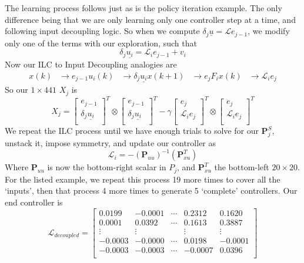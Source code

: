 The learning process follows just as is the policy iteration example. The only difference being that we are only learning only one controller step at a time, and following input decoupling logic. So when we compute $\delta_j\underline{u}=\mathcal{L}e_{j-1}$, we modify only one of the terms with our exploration, such that
\begin{equation}
    \delta_j\underline{u_i}=\mathcal{L}_i e_{j-1}+v_i
\end{equation}
Now our ILC to Input Decoupling analogies are
\begin{align}
    x\left(k\right)&\rightarrow e_{j-1}
    u_i\left(k\right)&\rightarrow\delta_j\underline{u_i}
    x\left(k+1\right)&\rightarrow e_j
    F_i x\left(k\right)&\rightarrow\mathcal{L}_i e_j
\end{align}
So our $1 \times441$ $X_j$ is 
\begin{equation}
    X_j={\left[\begin{matrix}e_{j-1}\\\delta_j\underline{u_i}\\\end{matrix}\right]}^T\otimes{\left[\begin{matrix}e_{j-1}\\\delta_j\underline{u_i}\\\end{matrix}\right]}^T-{\gamma\left[\begin{matrix}e_j\\\mathcal{L}_i e_j\\\end{matrix}\right]}^T\otimes{\left[\begin{matrix}e_j\\\mathcal{L}_i e_j\\\end{matrix}\right]}^T
\end{equation}
We repeat the ILC process until we have enough trials to solve for our $\textbf{P}_j^S$, unstack it, impose symmetry, and update our controller as
\begin{equation}
    \mathcal{L}_i=-{\left(\textbf{P}_{uu}\right)}^{-1}\left(\textbf{P}_{xu}^T\right)
\end{equation}
Where $\textbf{P}_{uu}$ is now the bottom-right scalar in $P_j$, and $\textbf{P}_{xu}^T$ the bottom-left $20\times20$. For the listed example, we repeat this process 19 more times to cover all the `inputs', then that process 4 more times to generate 5 `complete' controllers. Our end controller is
\begin{equation}
    \mathcal{L}_{decoupled}=\left[\begin{matrix}0.0199&-0.0001&\cdots&0.2312&0.1620\\0.0001&0.0392&\cdots&0.1613&0.3887\\\vdots&\vdots&&\vdots&\vdots\\-0.0003&-0.0000&\cdots&0.0198&-0.0001\\-0.0003&-0.0003&\cdots&-0.0007&0.0396\\\end{matrix}\right]
    \label{eq:decoupled_ilc_controller}
\end{equation}
